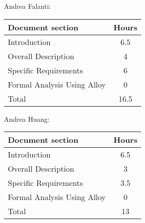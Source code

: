 Andrea Falanti:

\begin{tabular}{|l|c|}
    \hline
    Document section & Hours \\
    \hline
     Introduction & 6.5\\
     Overall Description & 4\\
     Specific Requirements & 6\\
     Formal Analysis Using Alloy & 0\\
     \hline
     Total & 16.5\\
     \hline
\end{tabular}
\vskip 0.3in

Andrea Huang:

\begin{tabular}{|l|c|}
    \hline
    Document section & Hours \\
    \hline
     Introduction &  6.5\\
     Overall Description & 3\\
     Specific Requirements & 3.5\\
     Formal Analysis Using Alloy & 0\\
     \hline
     Total & 13\\
     \hline
\end{tabular}
